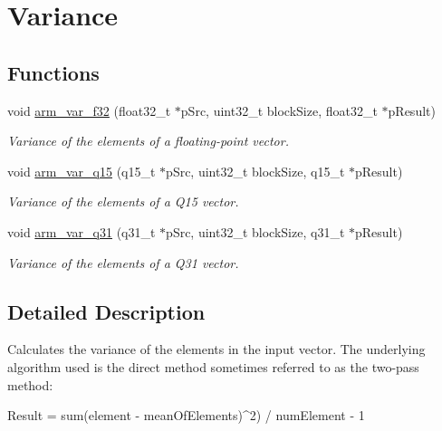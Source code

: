 \hypertarget{group__variance}{}\section{Variance}
\label{group__variance}
\subsection*{Functions}
\begin{DoxyCompactItemize}
\item 
void \hyperlink{group__variance_ga393f26c5a3bfa05624fb8d32232a6d96}{arm\+\_\+var\+\_\+f32} (float32\+\_\+t $\ast$p\+Src, uint32\+\_\+t block\+Size, float32\+\_\+t $\ast$p\+Result)
\begin{DoxyCompactList}\small\item\em Variance of the elements of a floating-\/point vector. \end{DoxyCompactList}\item 
void \hyperlink{group__variance_ga79dce009ed2de28a125aeb3f19631654}{arm\+\_\+var\+\_\+q15} (q15\+\_\+t $\ast$p\+Src, uint32\+\_\+t block\+Size, q15\+\_\+t $\ast$p\+Result)
\begin{DoxyCompactList}\small\item\em Variance of the elements of a Q15 vector. \end{DoxyCompactList}\item 
void \hyperlink{group__variance_gac02873f1c2cc80adfd799305f0e6465d}{arm\+\_\+var\+\_\+q31} (q31\+\_\+t $\ast$p\+Src, uint32\+\_\+t block\+Size, q31\+\_\+t $\ast$p\+Result)
\begin{DoxyCompactList}\small\item\em Variance of the elements of a Q31 vector. \end{DoxyCompactList}\end{DoxyCompactItemize}


\subsection{Detailed Description}
Calculates the variance of the elements in the input vector. The underlying algorithm used is the direct method sometimes referred to as the two-\/pass method\+:


\begin{DoxyPre}
  Result = sum(element - meanOfElements)^2) / numElement - 1\end{DoxyPre}



